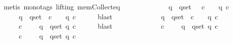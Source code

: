 \begin{isabellebody}
\ \ \ \ \isamarkupfalse%
\ {\isacharparenleft}metis\ {\isacharparenleft}mono{\isacharunderscore}tags{\isacharcomma}\ lifting{\isacharparenright}\ mem{\isacharunderscore}Collect{\isacharunderscore}eq{\isacharparenright}\isanewline
\ \ \isamarkupfalse%
\ \isamarkupfalse%
\isanewline
\ \ \ \ {\isachardoublequoteopen}{\isacharparenleft}{\isasymexists}\ {\isasymsigma}\ {\isasymin}\ {\isasymSigma}{\isachardot}\ {\isasymforall}\ q\ {\isasymin}\ q{\isacharunderscore}set{\isachardot}\ {\isacharparenleft}{\isasymlambda}{\isasymsigma}{\isacharprime}{\isachardot}\ {\isasymforall}\ c\ {\isasymin}\ {\isasymepsilon}\ {\isasymsigma}{\isacharprime}{\isachardot}\ q\ c{\isacharparenright}\ {\isasymsigma}{\isacharparenright}\isanewline
\ \ \ \ {\isasymlongrightarrow}\ {\isacharparenleft}{\isasymexists}\ {\isasymsigma}\ {\isasymin}\ {\isasymSigma}{\isachardot}\ {\isasymforall}\ q{\isacharprime}\ {\isasymin}\ q{\isacharunderscore}set{\isachardot}\ {\isasymforall}\ c\ {\isasymin}\ {\isasymepsilon}\ {\isasymsigma}{\isachardot}\ q{\isacharprime}\ c{\isacharparenright}{\isachardoublequoteclose}\isanewline
\ \ \ \ \isamarkupfalse%
\ blast\isanewline
\ \ \isamarkupfalse%
\ \isamarkupfalse%
\isanewline
\ \ \ \ {\isachardoublequoteopen}{\isacharparenleft}{\isasymexists}\ {\isasymsigma}\ {\isasymin}\ {\isasymSigma}{\isachardot}\ {\isasymforall}\ q\ {\isasymin}\ q{\isacharunderscore}set{\isachardot}\ {\isasymforall}\ c\ {\isasymin}\ {\isasymepsilon}\ {\isasymsigma}{\isachardot}\ q\ c{\isacharparenright}\isanewline
\ \ \ \ {\isasymlongrightarrow}\ {\isacharparenleft}{\isasymexists}\ {\isasymsigma}\ {\isasymin}\ {\isasymSigma}{\isachardot}\ {\isasymforall}\ c\ {\isasymin}\ {\isasymepsilon}\ {\isasymsigma}{\isachardot}\ {\isasymforall}\ q{\isacharprime}\ {\isasymin}\ q{\isacharunderscore}set{\isachardot}\ q{\isacharprime}\ c{\isacharparenright}{\isachardoublequoteclose}\isanewline
\ \ \ \ \isamarkupfalse%
\ blast\isanewline
\ \ \isamarkupfalse%
\ \isamarkupfalse%
\isanewline
\ \ \ \ {\isachardoublequoteopen}{\isacharparenleft}{\isasymexists}\ {\isasymsigma}\ {\isasymin}\ {\isasymSigma}{\isachardot}\ {\isasymforall}\ c\ {\isasymin}\ {\isasymepsilon}\ {\isasymsigma}{\isachardot}\ {\isasymforall}\ q\ {\isasymin}\ q{\isacharunderscore}set{\isachardot}\ q\ c{\isacharparenright}\isanewline
\ \ \ \ {\isasymlongrightarrow}\ {\isacharparenleft}{\isasymexists}\ {\isasymsigma}\ {\isasymin}\ {\isasymSigma}{\isachardot}\ {\isasymexists}\ c\ {\isasymin}\ {\isasymepsilon}\ {\isasymsigma}{\isachardot}\ {\isasymforall}\ q{\isacharprime}\ {\isasymin}\ q{\isacharunderscore}set{\isachardot}\ q{\isacharprime}\ c{\isacharparenright}{\isachardoublequoteclose}\isanewline

\end{isabellebody}
